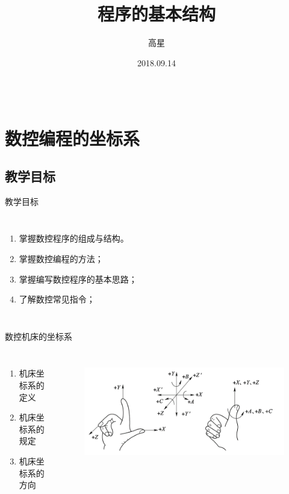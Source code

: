 \documentclass[UTF8,zihao=-4]{ctexbeamer}
\title{程序的基本结构}
\author{高星}
\institute{湖南潇湘技师学院~湖南九嶷职院}
\date{2018.09.14}
\begin{document}
\begin{frame}[plain]
		\maketitle
\end{frame}

\begin{frame}
\begin{columns}
\tableofcontents[hideallsubsections]
\end{columns}
\end{frame}

\section{数控编程的坐标系}
\subsection{教学目标}
\begin{frame}{教学目标}
\begin{columns}
	\begin{enumerate}
	\item 掌握数控程序的组成与结构。
	\item 掌握数控编程的方法；
	\item 掌握编写数控程序的基本思路；
	\item 了解数控常见指令；
\end{enumerate}
\end{columns}
\end{frame}

\begin{frame}{数控机床的坐标系}
	\begin{columns}
		\begin{enumerate}
			\item 机床坐标系的定义
			\item 机床坐标系的规定 
			\item 机床坐标系的方向
		\end{enumerate} 
		\begin{figure}
			\centering
			\includegraphics[width= \linewidth]{image/1-22}
			\label{fig:1-22}
		\end{figure}
	\end{columns}
\end{frame}
\end{document}
